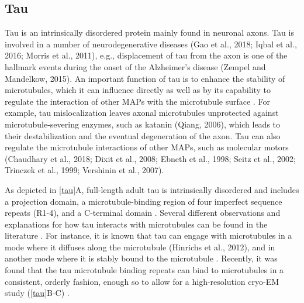 \subsection{Tau}
Tau is an intrinsically disordered protein mainly found in neuronal axons. Tau is involved in a number of neurodegenerative diseases (Gao et al., 2018; Iqbal et al., 2016; Morris et al., 2011), e.g., displacement of tau from the axon is one of the hallmark events during the onset of the Alzheimer’s disease (Zempel and Mandelkow, 2015). An important function of tau is to enhance the stability of microtubules, which it can influence directly \cite{Drechsel1992} as well as by its capability to regulate the interaction of other MAPs with the microtubule surface \parencite{Morris2011b}. For example, tau mislocalization leaves axonal microtubules unprotected against microtubule-severing enzymes, such as katanin (Qiang, 2006), which leads to their destabilization and the eventual degeneration of the axon. Tau can also regulate the microtubule interactions of other MAPs, such as molecular motors (Chaudhary et al., 2018; Dixit et al., 2008; Ebneth et al., 1998; Seitz et al., 2002; Trinczek et al., 1999; Vershinin et al., 2007). \par
As depicted in \autoref{tau}A, full-length adult tau is intrinsically disordered and includes a projection domain, a microtubule-binding region of four imperfect sequence repeats (R1-4), and a C-terminal domain \parencite{Himmler1381}.
Several different observations and explanations for how tau interacts with microtubules can be found in the literature \parencite{Morris2011b,Mcvicker2014,Kellogg2018}. For instance, it is known that tau can engage with microtubules in a mode where it diffuses along the microtubule (Hinrichs et al., 2012), and in another mode where it is stably bound to the microtubule \parencite{Mcvicker2014}. Recently, it was found that the tau microtubule binding repeats can bind to microtubules in a consistent, orderly fashion, enough so to allow for a high-resolution cryo-EM study (\autoref{tau}B-C) \parencite{Kellogg2018}. 
